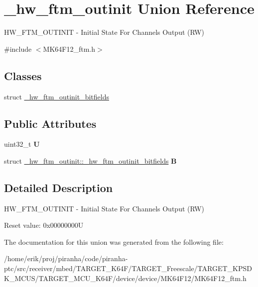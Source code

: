 \hypertarget{union__hw__ftm__outinit}{}\section{\+\_\+hw\+\_\+ftm\+\_\+outinit Union Reference}
\label{union__hw__ftm__outinit}


H\+W\+\_\+\+F\+T\+M\+\_\+\+O\+U\+T\+I\+N\+IT -\/ Initial State For Channels Output (RW)  




{\ttfamily \#include $<$M\+K64\+F12\+\_\+ftm.\+h$>$}

\subsection*{Classes}
\begin{DoxyCompactItemize}
\item 
struct \hyperlink{struct__hw__ftm__outinit_1_1__hw__ftm__outinit__bitfields}{\+\_\+hw\+\_\+ftm\+\_\+outinit\+\_\+bitfields}
\end{DoxyCompactItemize}
\subsection*{Public Attributes}
\begin{DoxyCompactItemize}
\item 
uint32\+\_\+t {\bfseries U}\hypertarget{union__hw__ftm__outinit_aef4f30c1073e0ebb251a5a4f958ad146}{}\label{union__hw__ftm__outinit_aef4f30c1073e0ebb251a5a4f958ad146}

\item 
struct \hyperlink{struct__hw__ftm__outinit_1_1__hw__ftm__outinit__bitfields}{\+\_\+hw\+\_\+ftm\+\_\+outinit\+::\+\_\+hw\+\_\+ftm\+\_\+outinit\+\_\+bitfields} {\bfseries B}\hypertarget{union__hw__ftm__outinit_a54babfcbe86b5feba81b729c688142ba}{}\label{union__hw__ftm__outinit_a54babfcbe86b5feba81b729c688142ba}

\end{DoxyCompactItemize}


\subsection{Detailed Description}
H\+W\+\_\+\+F\+T\+M\+\_\+\+O\+U\+T\+I\+N\+IT -\/ Initial State For Channels Output (RW) 

Reset value\+: 0x00000000U 

The documentation for this union was generated from the following file\+:\begin{DoxyCompactItemize}
\item 
/home/erik/proj/piranha/code/piranha-\/ptc/src/receiver/mbed/\+T\+A\+R\+G\+E\+T\+\_\+\+K64\+F/\+T\+A\+R\+G\+E\+T\+\_\+\+Freescale/\+T\+A\+R\+G\+E\+T\+\_\+\+K\+P\+S\+D\+K\+\_\+\+M\+C\+U\+S/\+T\+A\+R\+G\+E\+T\+\_\+\+M\+C\+U\+\_\+\+K64\+F/device/device/\+M\+K64\+F12/M\+K64\+F12\+\_\+ftm.\+h\end{DoxyCompactItemize}
